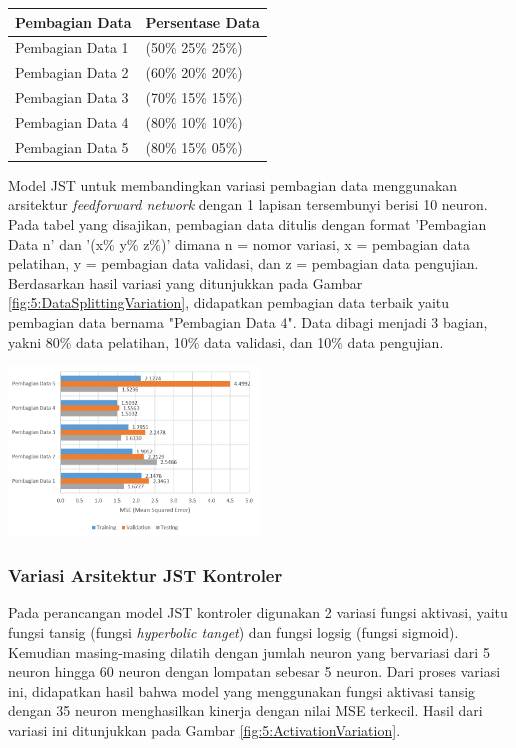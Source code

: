 \documentclass[a4paper,10pt]{article}
\makeatletter
\newenvironment{body}{\begin{multicols}{2}}{\end{multicols}}
\renewenvironment{table}
{\def\@captype{table}%
	\captionsetup{format=plain,labelsep=newline,font=footnotesize,textfont=sc,justification=centering}%
	\fontsize{8}{8}\selectfont
}
{}
\renewenvironment{figure}
{\def\@captype{figure}%
	\captionsetup{labelsep=period,format=hang,font=footnotesize,justification=justified}
}
{}
\makeatother
\begin{document}
\begin{body}
		\begin{table}
			\centering
			\caption{Tabel Daftar Variasi Pembagian Data}
			\label{tbl:5:NeuronVariation}
			\begin{tabularx}{\linewidth}{XX}\toprule
				\textbf{Pembagian Data} & \textbf{Persentase Data} \\ \toprule
				Pembagian Data 1 & (50\% 25\% 25\%) \\ \midrule
				Pembagian Data 2 & (60\% 20\% 20\%) \\ \midrule
				Pembagian Data 3 & (70\% 15\% 15\%) \\ \midrule
				Pembagian Data 4 & (80\% 10\% 10\%) \\ \midrule
				Pembagian Data 5 & (80\% 15\% 05\%) \\ \bottomrule
			\end{tabularx}
		\end{table}
		\vspace{1em}
		
		Model JST untuk membandingkan variasi pembagian data menggunakan arsitektur \textit{feedforward network} dengan 1 lapisan tersembunyi berisi 10 neuron. Pada tabel yang disajikan, pembagian data ditulis dengan format ’Pembagian Data n’ dan ’(x\% y\% z\%)’ dimana n = nomor variasi, x = pembagian data pelatihan, y = pembagian data validasi, dan z = pembagian data pengujian. Berdasarkan hasil variasi yang ditunjukkan pada Gambar \ref{fig:5:DataSplittingVariation}, didapatkan pembagian data terbaik yaitu pembagian data bernama "Pembagian Data 4". Data dibagi menjadi 3 bagian, yakni 80\% data pelatihan, 10\% data validasi, dan 10\% data pengujian.\\
		
		\begin{figure}
			\centering
			\includegraphics[width=0.5\textwidth]{figures/VariasiPembagianDataJSTKontroler}
			\caption{Grafik Variasi Pembagian Data}
			\label{fig:5:DataSplittingVariation}
		\end{figure}
		
		\subsubsection{Variasi Arsitektur JST Kontroler}
		Pada perancangan model JST kontroler digunakan 2 variasi fungsi aktivasi, yaitu fungsi tansig (fungsi \textit{hyperbolic tanget}) dan fungsi logsig (fungsi sigmoid). Kemudian masing-masing dilatih dengan jumlah neuron yang bervariasi dari 5 neuron hingga 60 neuron dengan lompatan sebesar 5 neuron. Dari proses variasi ini, didapatkan hasil bahwa model yang menggunakan fungsi aktivasi tansig dengan 35 neuron menghasilkan kinerja dengan nilai MSE terkecil. Hasil dari variasi ini ditunjukkan pada Gambar \ref{fig:5:ActivationVariation}.
		

\end{body}
\end{document}
